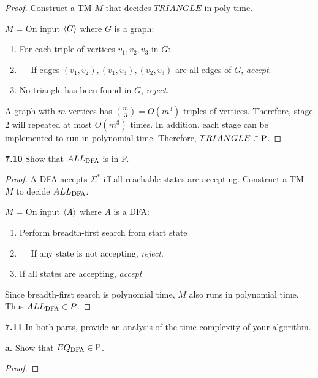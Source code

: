 \begin{mdframed}
\begin{proof}
Construct a TM $M$ that decides $TRIANGLE$ in poly time.

\medskip
$M$ = On input $\desc{G}$ where $G$ is a graph:
\begin{enumerate}
\item For each triple of vertices $v_1, v_2, v_3$ in $G$:
\item $\quad$ If edges $(v_1, v_2), (v_1, v_3), (v_2, v_3)$ are all edges of $G$, \textit{accept}.
\item No triangle has been found in $G$, \textit{reject}.
\end{enumerate}

A graph with $m$ vertices has $\binom{m}{3} = O(m^3)$ triples of vertices. Therefore, stage 2 will repeated at most $O(m^3)$ times. In addition, each stage can be implemented to run in polynomial time. Therefore, $TRIANGLE \in \P$.
\end{proof}
\end{mdframed}

\label{lang:ALLDFA_P}
\textbf{7.10} Show that $ALL_\DFA$ is in P.
\begin{mdframed}
\begin{proof}
A DFA accepts $\Sigma^*$ iff all reachable states are accepting. Construct a TM $M$ to decide $ALL_\DFA$.

\medskip
$M$ = On input $\desc{A}$ where $A$ is a DFA:
\begin{enumerate}
\item Perform breadth-first search from start state
\item $\quad$ If any state is not accepting, \textit{reject}.
\item If all states are accepting, \textit{accept}
\end{enumerate}

Since breadth-first search is polynomial time, $M$ also runs in polynomial time. Thus $ALL_\DFA \in P$.
\end{proof}
\end{mdframed}

\textbf{7.11} In both parts, provide an analysis of the time complexity of your algorithm.

\label{lang:EQDFA_P}
\textbf{a.} Show that $EQ_\DFA \in \P$.
\begin{mdframed}
\begin{proof}

\end{proof}
\end{mdframed}

